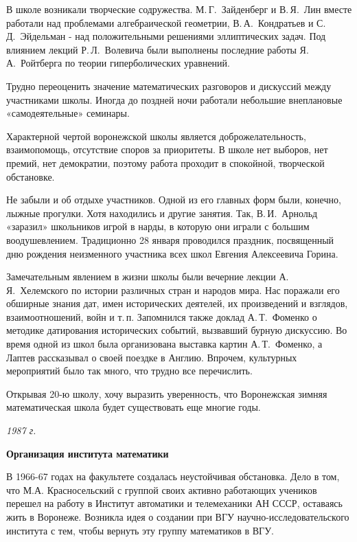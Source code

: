 В школе возникали творческие содружества.
М.\,Г.~Зай\-ден\-берг и В.\,Я.~Лин вместе работали над проблемами алгебраической геометрии, В.\,А.~Кондратьев и С.\,Д.~Эйдельман - над положительными решениями эллиптических задач. Под влиянием лекций Р.\,Л.~Волевича были выполнены последние работы Я.\,А.~Ройтберга по теории гиперболических уравнений.

Трудно переоценить значение математических разговоров и дискуссий между участниками школы.
Иногда до поз\-д\-ней ночи работали небольшие внеплановые «самодеятельные» семинары.

Характерной чертой воронежской школы является доброжелательность, взаимопомощь, отсутствие споров за приоритеты. В школе нет выборов, нет премий, нет демократии, поэтому работа проходит в спокойной, творческой обстановке.

Не забыли и об отдыхе участников. Одной из его главных форм были, конечно, лыжные прогулки. Хотя находились и другие занятия. Так, В.\,И.~Арнольд «заразил» школьников игрой в нарды, в которую они играли с большим воодушевлением. Традиционно 28 января проводился праздник, посвященный дню рождения неизменного участника всех школ Евгения Алексеевича Горина.

Замечательным явлением в жизни школы были вечерние лекции А.\,Я.~Хелемского по истории различных стран и народов мира.
Нас поражали его обширные знания дат, имен исторических деятелей, их произведений и взглядов,
взаимоотношений, войн и т.\,п.
Запомнился также доклад А.\,Т.~Фоменко о методике датирования исторических событий, вызвавший бурную дискуссию.
Во время одной из школ была организована выставка картин А.\,Т.~Фоменко,
а Лаптев рассказывал о своей поездке в Англию. Впрочем, культурных мероприятий было так много, что трудно все перечислить.

Открывая 20-ю школу, хочу выразить уверенность, что Воронежская зимняя математическая школа будет существовать еще многие годы.

\begin{flushright}
{\it 1987 г.}
\end{flushright}

{\bf Организация института математики}

В 1966-67 годах на факультете создалась неустойчивая обстановка. Дело в том, что М.А. Красносельский с группой своих активно работающих учеников перешел на работу в Институт автоматики и телемеханики АН СССР, оставаясь жить в Воронеже. Возникла идея о создании при ВГУ научно-исследовательского института с тем, чтобы вернуть эту группу математиков в ВГУ.

